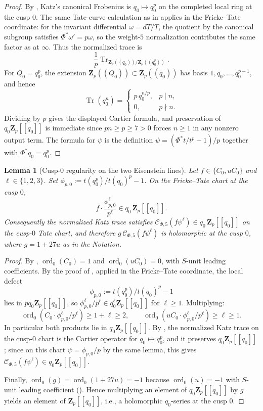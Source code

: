 \documentclass[11pt]{amsart}
\newtheorem{lemma}[theorem]{Lemma}
\theoremstyle{definition}
\theoremstyle{remark}
\newcommand{\Z}{\mathbf{Z}}
\newcommand{\ord}{\operatorname{ord}}
\newcommand{\Tr}{\operatorname{Tr}}
\begin{document}
\begin{proof}
By , Katz's canonical Frobenius is $q_0\mapsto q_0^p$ on the completed local ring at the cusp $0$. The same Tate-curve calculation as in  applies in the Fricke--Tate coordinate: for the invariant differential $\omega=dT/T$, the quotient by the canonical subgroup satisfies $\Phi^*\omega'=p\omega$, so the weight-$5$ normalization contributes the same factor as at $\infty$. Thus the normalized trace is
\[
\frac{1}{p}\Tr_{\Z_p((q_0))/\Z_p((q_0^p))}.
\]
For $Q_0=q_0^p$, the extension $\Z_p((Q_0))\subset\Z_p((q_0))$ has basis $1,q_0,\ldots,q_0^{p-1}$, and hence
\[
\Tr(q_0^n)=\begin{cases}p\,q_0^{n/p},&p\mid n,\\ 0,&p\nmid n.\end{cases}
\]
Dividing by $p$ gives the displayed Cartier formula, and preservation of $q_0\Z_p[[q_0]]$ is immediate since $pn\ge p\ge 7>0$ forces $n\ge 1$ in any nonzero output term. The formula for $\psi$ is the definition $\psi=(\Phi^*t/t^p-1)/p$ together with $\Phi^*q_0=q_0^p$.
\end{proof}

\begin{lemma}[Cusp-$0$ regularity on the two Eisenstein lines]\label{lem:cusp-0-regularity-basis}
Let $f\in\{C_0,uC_0\}$ and $\ell\in\{1,2,3\}$. Set $\phi_{p,0}:=t(q_0^p)/t(q_0)^p-1$. On the Fricke--Tate chart at the cusp $0$,
\[
f\cdot\frac{\phi_{p,0}^\ell}{p^\ell}\in q_0\,\Z_p[[q_0]].
\]
Consequently the normalized Katz trace satisfies $\mathcal C_{\Phi,5}(f\psi^\ell)\in q_0\,\Z_p[[q_0]]$ on the cusp-$0$ Tate chart, and therefore $g\,\mathcal C_{\Phi,5}(f\psi^\ell)$ is holomorphic at the cusp $0$, where $g=1+27u$ as in the Notation.
\end{lemma}

\begin{proof}
By , $\ord_0(C_0)=1$ and $\ord_0(uC_0)=0$, with $S$-unit leading coefficients. By the proof of , applied in the Fricke--Tate coordinate, the local defect
\[
\phi_{p,0}:=t(q_0^p)/t(q_0)^p-1
\]
lies in $pq_0\Z_p[[q_0]]$, so $\phi_{p,0}^\ell/p^\ell\in q_0^\ell\Z_p[[q_0]]$ for $\ell\ge 1$. Multiplying:
\[
\ord_0\!\left(C_0\cdot\phi_{p,0}^\ell/p^\ell\right)\ge 1+\ell\ge 2,\qquad
\ord_0\!\left(uC_0\cdot\phi_{p,0}^\ell/p^\ell\right)\ge \ell\ge 1.
\]
In particular both products lie in $q_0\Z_p[[q_0]]$. By , the normalized Katz trace on the cusp-$0$ chart is the Cartier operator for $q_0\mapsto q_0^p$, and it preserves $q_0\Z_p[[q_0]]$; since on this chart $\psi=\phi_{p,0}/p$ by the same lemma, this gives $\mathcal C_{\Phi,5}(f\psi^\ell)\in q_0\Z_p[[q_0]]$.

Finally, $\ord_0(g)=\ord_0(1+27u)=-1$ because $\ord_0(u)=-1$ with $S$-unit leading coefficient (). Hence multiplying an element of $q_0\Z_p[[q_0]]$ by $g$ yields an element of $\Z_p[[q_0]]$, i.e., a holomorphic $q_0$-series at the cusp $0$.
\end{proof}
\end{document}
